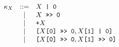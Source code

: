 \documentclass{article}
\newcommand{\mathjs}[1]{\mbox{\texttt{{#1}}}}
\newcommand{\getprop}[2]{{#1}\mathjs{[}{#2}\mathjs{]}}
\newcommand{\longlong}[2]{\mathjs{[}{#1},{#2}\mathjs{]}}
\newcommand{\toint}[1]{{#1}\mathjs{ | 0}}
\newcommand{\touint}[1]{{#1}\mathjs{ >>> 0}}
\begin{document}
\[
\begin{array}{rcl}
\kappa_X & ::= & \toint{X} \\
         &  |  & \touint{X} \\
         &  |  & \mathjs{+}X \\
         &  |  & \longlong{\touint{\getprop{X}{\mathjs{0}}}}{\toint{\getprop{X}{\mathjs{1}}}} \\
         &  |  & \longlong{\touint{\getprop{X}{\mathjs{0}}}}{\touint{\getprop{X}{\mathjs{1}}}} \\
\end{array}
\]
\end{document}
